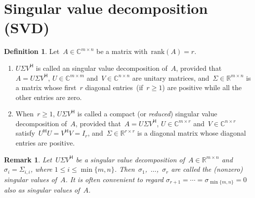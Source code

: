 \documentclass[11pt,a4paper]{article}  %
\numberwithin{equation}{section}
\newtheorem{remark}{Remark}%
\theoremstyle{definition}
\newtheorem{definition}{Definition}%
\def\RR{\mathbb{R}}
\def\CC{\mathbb{C}}
\newcommand{\hmt}{{\scriptscriptstyle{{\mathsf{H}}}}}
\newcommand{\rank}{\mathrm{rank}}
\begin{document}


\section{Singular value decomposition (SVD)}

\begin{definition}
  \label{def:svd}
  Let~$A\in \CC^{m\times n}$ be a matrix with~$\rank(A) = r$.
  \begin{enumerate}[leftmargin=1.5em]
    \item
      $U\Sigma V^\hmt$ is called an singular value decomposition of~$A$,
      provided that~$A = U \Sigma V^\hmt$, $U
      \in \CC^{m\times m}$ and~$V\in\CC^{n\times n}$ are unitary matrices, and~$\Sigma \in
      \RR^{m\times n}$ is a matrix whose first~$r$ diagonal entries~(if~$r\ge 1$) are positive
      while all the other entries are zero.
    \item
      When~$r \ge 1$, $U\Sigma V^\hmt$ is called a compact (or \emph{reduced}) singular value decomposition of~$A$,
      provided that~$A = U \Sigma V^\hmt$, $U \in \CC^{m\times r}$ and~$V\in \CC^{n\times r}$
      satisfy~$U^\hmt U = V^\hmt V = I_r$,
      and~$\Sigma \in \RR^{r\times r}$ is a diagonal matrix whose diagonal entries are positive.
  \end{enumerate}
\end{definition}

\begin{remark}
  Let~$U\Sigma V^\hmt$ be a singular value decomposition of~$A\in \RR^{m\times n}$ and $\sigma_i
  = \Sigma_{i,i}$, where $1\le i\le \min\{m,n\}$. Then~\mbox{$\sigma_1$, $\dots$, $\sigma_r$} are called the
  \textnormal{(}nonzero\textnormal{)} singular values of~$A$. It is often convenient to
  regard $\sigma_{r+1}=\cdots=\sigma_{\min\{m,n\}} = 0$ also as singular values of~$A$.
\end{remark}
\end{document}
